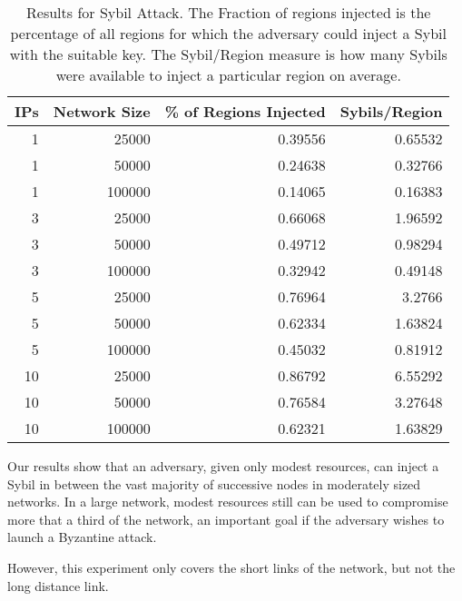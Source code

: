 \documentclass[a4paper]{article}
\begin{document}
\begin{table}[h]\small

\begin{center}
       
\begin{tabular}{|r|r|r|r|}
    \hline
    IPs & Network Size & \% of Regions Injected & Sybils/Region \\ \hline
    1 & 25000 & 0.39556 & 0.65532 \\ \hline
    1 & 50000 & 0.24638 & 0.32766 \\ \hline
    1 & 100000 & 0.14065 & 0.16383 \\ \hline
    3 & 25000 & 0.66068 & 1.96592 \\ \hline
    3 & 50000 & 0.49712 & 0.98294 \\ \hline
    3 & 100000 & 0.32942 & 0.49148 \\ \hline
    5 & 25000 & 0.76964 & 3.2766 \\ \hline
    5 & 50000 & 0.62334 & 1.63824 \\ \hline
    5 & 100000 & 0.45032 & 0.81912 \\ \hline
    10 & 25000 & 0.86792 & 6.55292 \\ \hline
    10 & 50000 & 0.76584 & 3.27648 \\ \hline
    10 & 100000 & 0.62321 & 1.63829 \\ \hline
\end{tabular}
\label{exp2}
\caption{Results for Sybil Attack.  The Fraction of regions injected is the percentage of all regions for which the adversary could inject a Sybil with the suitable key. The Sybil/Region measure is how many Sybils were available to inject a particular region on average.}
\end{center}

\end{table}

Our results show that an adversary, given only modest resources, can inject a Sybil in between the vast majority of successive nodes in moderately sized networks.
In a large network, modest resources still can be used to compromise more that a third of the network, an  important goal if the adversary  wishes to launch a Byzantine attack.



However, this experiment only covers the short links of the network, but not the long distance link.
\end{document}
